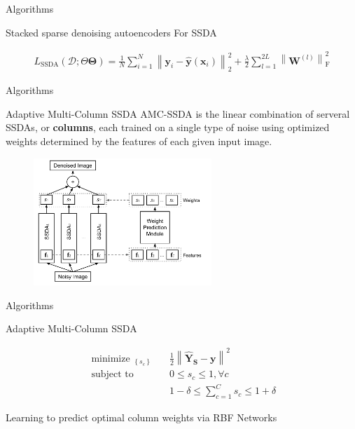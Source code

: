 \documentclass[notes]{beamer}
\begin{document}
\begin{frame}{Algorithms}
	\begin{block}{Stacked sparse denoising autoencoders}
		For SSDA
		 \begin{small}
		 	 \begin{equation}
		 	\begin{split}
		 		L _ { \mathrm { SSDA } } ( \mathcal { D } ;\Theta \mathbf { \Theta } ) = \frac { 1 } { N } \sum _ { i = 1 } ^ { N } \left\| \mathbf { y } _ { i } - \hat { \mathbf { y } } \left( \mathbf { x } _ { i } \right) \right\| _ { 2 } ^ { 2 } + \frac { \lambda } { 2 } \sum _ { l = 1 } ^ { 2 L } \left\| \mathbf { W } ^ { ( l ) } \right\| _ { \mathrm { F } } ^ { 2 }
		 	\end{split}
		 \end{equation}
		 \end{small}
	\end{block}
\end{frame}

\begin{frame}{Algorithms}
	\begin{block}{Adaptive Multi-Column SSDA}
	AMC-SSDA is the linear combination of serveral SSDAs, or \textbf{columns}, each trained on a single type of noise using optimized weights determined by the features of each given input image.
		\begin{figure}
		\includegraphics[width=0.6\textwidth]{2.png}
	\end{figure}
	\end{block}
\end{frame}


\begin{frame}{Algorithms}
	\begin{block}{Adaptive Multi-Column SSDA}
		 \begin{small}
		 	 \begin{equation}
		 	\begin{split}
		 	\text { minimize } _ { \left\{ s _ { c } \right\} } \quad &\frac { 1 } { 2 } \left\| \hat { \mathbf { Y } } _ { \mathbf { S } } - \mathbf { y } \right\| ^ { 2 }\\
		 	\text { subject to } \quad &0 \leq s _ { c } \leq 1 , \forall c\\
		 	&1 - \delta \leq \sum _ { c = 1 } ^ { C } s _ { c } \leq 1 + \delta
		 	\end{split}
		 \end{equation}
		 \end{small}
		 Learning to predict optimal column weights via RBF Networks
	\end{block}
\end{frame}
\end{document}
